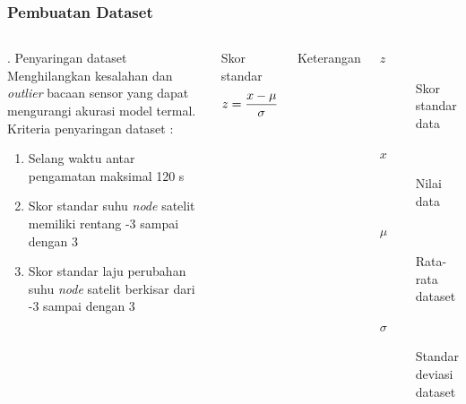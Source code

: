 \documentclass[8pt]{beamer}
\begin{document}
\begin{frame}
  \frametitle{Pembuatan Dataset}
  \begin{columns}[T]
      \begin{block}{. Penyaringan dataset}
        Menghilangkan kesalahan dan \textit{outlier} bacaan sensor yang dapat mengurangi akurasi model termal.
      Kriteria penyaringan dataset :
\begin{enumerate}
\item Selang waktu antar pengamatan maksimal 120 s 
\item Skor standar suhu \textit{node} satelit memiliki rentang -3 sampai dengan 3
\item Skor standar laju perubahan suhu \textit{node} satelit berkisar dari -3 sampai dengan 3 
\end{enumerate}
      \end{block}
      \begin{block}{\center Skor standar}
\begin{equation}
\label{eq:zscore}
\small
	z = \frac{x - \mu}{\sigma}
\end{equation}
      \end{block}
      \small
\center Keterangan \cite{massaron}

    \begin{description}
        \item[$z$] Skor standar data
        \item[$x$] Nilai data
        \item[$\mu$] Rata-rata dataset
        \item[$\sigma$] Standar deviasi dataset
    \end{description}

  \end{columns}
\end{frame}
\end{document}
